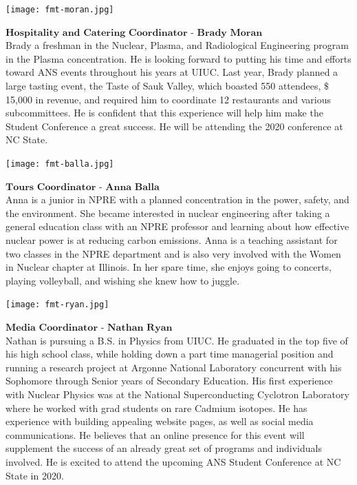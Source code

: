 \begin{minipage}{0.25\textwidth}
	\centering
	\texttt{[image: fmt-moran.jpg]}
\end{minipage}
\begin{minipage}{0.73\textwidth}
	$\textbf{Hospitality and Catering Coordinator - Brady Moran}$\\
Brady a freshman in the Nuclear, Plasma, and Radiological Engineering program in the Plasma concentration. He is looking forward to putting his time and efforts toward ANS events throughout his years at UIUC. Last year, Brady planned a large tasting event, the Taste of Sauk Valley, which boasted 550 attendees, $\$$15,000 in revenue, and required him to coordinate 12 restaurants and various subcommittees. He is confident that this experience will help him make the Student Conference a great success. He will be attending the 2020 conference at NC State.
\end{minipage}

\begin{minipage}{0.25\textwidth}
	\centering
	\texttt{[image: fmt-balla.jpg]}
\end{minipage}
\begin{minipage}{0.73\textwidth}
	$\textbf{Tours Coordinator - Anna Balla}$\\
Anna is a junior in NPRE with a planned concentration in the power, safety, and the environment. She became interested in nuclear engineering after taking a general education class with an NPRE professor and learning about how effective nuclear power is at reducing carbon emissions. Anna is a teaching assistant for two classes in the NPRE department and is also very involved with the Women in Nuclear chapter at Illinois. In her spare time, she enjoys going to concerts, playing volleyball, and wishing she knew how to juggle.
\end{minipage}

\begin{minipage}{0.25\textwidth}
	\centering
	\texttt{[image: fmt-ryan.jpg]}
\end{minipage}
\begin{minipage}{0.73\textwidth}
$\textbf{Media Coordinator - Nathan Ryan}$\\
	Nathan is pursuing a B.S. in Physics from UIUC. He graduated in the top five of his high school class, while holding down a part time managerial position and running a research project at Argonne National Laboratory concurrent with his Sophomore through Senior years of Secondary Education. His first experience with Nuclear Physics was at the National Superconducting Cyclotron Laboratory where he worked with grad students on rare Cadmium isotopes. He has experience with building appealing website pages, as well as social media communications. He believes that an online presence for this event will supplement the success of an already great set of programs and individuals involved. He is excited to attend the upcoming ANS Student Conference at NC State in 2020.
\end{minipage}


